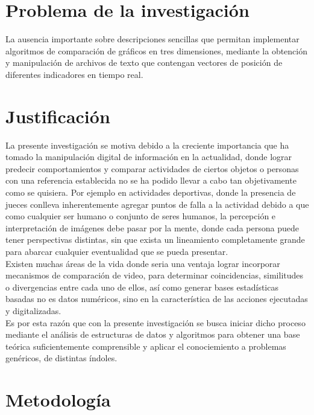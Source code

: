 \documentclass[letterpaper]{article}
\begin{document}
\section{Problema de la investigaci\' on}
La ausencia importante sobre descripciones sencillas que permitan implementar algoritmos de comparaci\' on de gr\' aficos en tres dimensiones, mediante la obtenci\' on y manipulaci\' on de archivos de texto que contengan vectores de posici\' on de diferentes indicadores en tiempo real. 
\section{Justificación}
La presente investigaci\' on se motiva debido a la creciente importancia que ha tomado la manipulaci\' on digital de informaci\' on en la actualidad, donde lograr predecir comportamientos y comparar actividades de ciertos objetos o personas con una referencia establecida no se ha podido llevar a cabo tan objetivamente como se quisiera. Por ejemplo en actividades deportivas, donde la presencia de jueces conlleva inherentemente agregar puntos de falla a la actividad debido a que como cualquier ser humano o conjunto de seres humanos, la percepci\' on e interpretaci\' on de im\' agenes debe pasar por la mente, donde cada persona puede tener perspectivas distintas, sin que exista un lineamiento completamente grande para abarcar cualquier eventualidad que se pueda presentar.\\
Existen muchas \' areas de la vida donde seria una ventaja lograr incorporar mecanismos de comparaci\' on de video, para determinar coincidencias, similitudes o divergencias entre cada uno de ellos, as\'i como generar bases estad\' isticas basadas no es datos num\' ericos, sino en la caracter\' istica de las acciones ejecutadas y digitalizadas.\\
Es por esta raz\' on que con la presente investigaci\' on se busca iniciar dicho proceso mediante el an\' alisis de estructuras de datos y algoritmos para obtener una base te\' orica suficientemente comprensible y aplicar el conociemiento a problemas gen\' ericos, de distintas \' indoles.

\section{Metodología}
\end{document}
